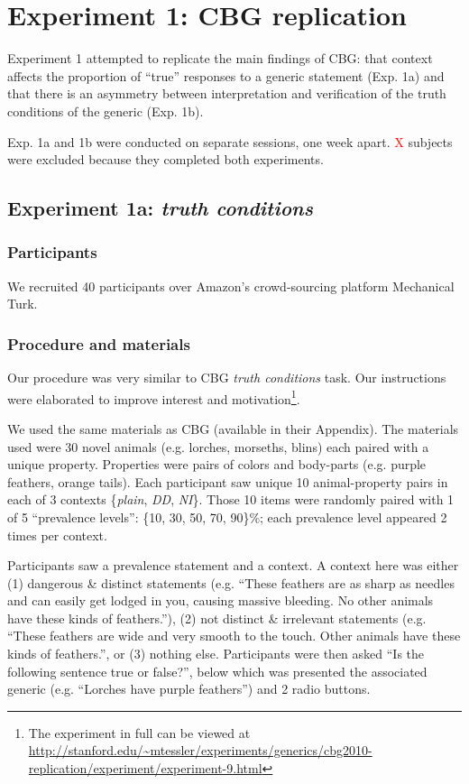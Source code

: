 \documentclass[10pt,letterpaper]{article}
\newcommand{\red}[1]{\textcolor{Red}{#1}}
\begin{document}
\section{Experiment 1: CBG replication}

Experiment 1 attempted to replicate the main findings of CBG: that context affects the proportion of ``true'' responses to a generic statement (Exp. 1a) and that there is an asymmetry between interpretation and verification of the truth conditions of the generic (Exp. 1b). 

Exp. 1a and 1b were conducted on separate sessions, one week apart. \red{X} subjects were excluded because they completed both experiments.

\subsection{Experiment 1a: \emph{truth conditions}}

\subsubsection{Participants}

We recruited 40 participants over Amazon's crowd-sourcing platform Mechanical Turk.  

\subsubsection{Procedure and materials}

Our procedure was very similar to CBG \emph{truth conditions} task. Our instructions were elaborated to improve interest and motivation\footnote{The experiment in full can be viewed at \url{http://stanford.edu/~mtessler/experiments/generics/cbg2010-replication/experiment/experiment-9.html}}. 

We used the same materials as CBG (available in their Appendix). The materials used were 30 novel animals (e.g. lorches, morseths, blins) each paired with a unique property. Properties were pairs of colors and body-parts (e.g. purple feathers, orange tails). Each participant saw unique 10 animal-property pairs in each of 3 contexts \{\emph{plain}, \emph{DD}, \emph{NI}\}. Those 10 items were randomly paired with 1 of 5 ``prevalence levels'': \{10, 30, 50, 70, 90\}\%; each prevalence level appeared 2 times per context. 

Participants saw a prevalence statement and a context. A context here was either (1) dangerous \& distinct statements (e.g. ``These feathers are as sharp as needles and can easily get lodged in you, causing massive bleeding. No other animals have these kinds of feathers.''), (2) not distinct \& irrelevant statements (e.g. ``These feathers are wide and very smooth to the touch. Other animals have these kinds of feathers.'', or (3) nothing else. Participants were then asked ``Is the following sentence true or false?'', below which was presented the associated generic (e.g. ``Lorches have purple feathers'') and 2 radio buttons. 
\end{document}
